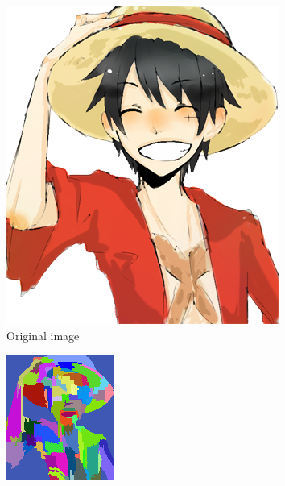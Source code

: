 \documentclass{beamer}
\begin{document}
\begin{frame}
\begin{figure}[htb!]
\centering
\begin{subfigure}{.3\textwidth}
\includegraphics[width=\textwidth]{../images/rufy_d.png}
\caption{Original image}
\end{subfigure}
\begin{subfigure}{.3\textwidth}
\includegraphics[width=\textwidth]{../images/luffyK100.png}

\end{subfigure}
\end{figure}
\end{frame}
\end{document}
